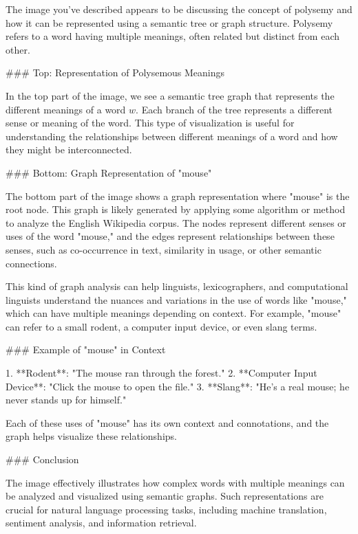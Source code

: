 The image you've described appears to be discussing the concept of polysemy and how it can be represented using a semantic tree or graph structure. Polysemy refers to a word having multiple meanings, often related but distinct from each other.

### Top: Representation of Polysemous Meanings

In the top part of the image, we see a semantic tree graph that represents the different meanings of a word \( w \). Each branch of the tree represents a different sense or meaning of the word. This type of visualization is useful for understanding the relationships between different meanings of a word and how they might be interconnected.

### Bottom: Graph Representation of "mouse"

The bottom part of the image shows a graph representation where "mouse" is the root node. This graph is likely generated by applying some algorithm or method to analyze the English Wikipedia corpus. The nodes represent different senses or uses of the word "mouse," and the edges represent relationships between these senses, such as co-occurrence in text, similarity in usage, or other semantic connections.

This kind of graph analysis can help linguists, lexicographers, and computational linguists understand the nuances and variations in the use of words like "mouse," which can have multiple meanings depending on context. For example, "mouse" can refer to a small rodent, a computer input device, or even slang terms.

### Example of "mouse" in Context

1. **Rodent**: "The mouse ran through the forest."
2. **Computer Input Device**: "Click the mouse to open the file."
3. **Slang**: "He's a real mouse; he never stands up for himself."

Each of these uses of "mouse" has its own context and connotations, and the graph helps visualize these relationships.

### Conclusion

The image effectively illustrates how complex words with multiple meanings can be analyzed and visualized using semantic graphs. Such representations are crucial for natural language processing tasks, including machine translation, sentiment analysis, and information retrieval.